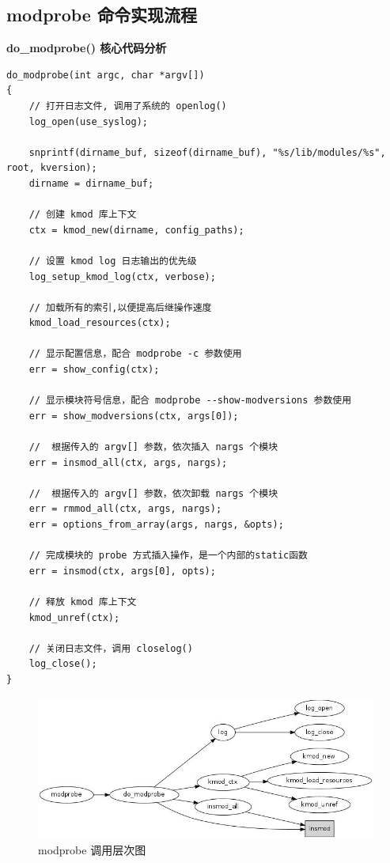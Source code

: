 \subsection{modprobe 命令实现流程}

\textbf{do\_modprobe() 核心代码分析}

{\begin{shaded}\begin{verbatim}
do_modprobe(int argc, char *argv[])
{
    // 打开日志文件, 调用了系统的 openlog()
    log_open(use_syslog);

    snprintf(dirname_buf, sizeof(dirname_buf), "%s/lib/modules/%s", root, kversion);
    dirname = dirname_buf;

    // 创建 kmod 库上下文
    ctx = kmod_new(dirname, config_paths);

    // 设置 kmod log 日志输出的优先级
    log_setup_kmod_log(ctx, verbose);

    // 加载所有的索引,以便提高后继操作速度
    kmod_load_resources(ctx);

    // 显示配置信息，配合 modprobe -c 参数使用
    err = show_config(ctx); 

    // 显示模块符号信息，配合 modprobe --show-modversions 参数使用
    err = show_modversions(ctx, args[0]);

    //  根据传入的 argv[] 参数，依次插入 nargs 个模块
    err = insmod_all(ctx, args, nargs);

    //  根据传入的 argv[] 参数，依次卸载 nargs 个模块
    err = rmmod_all(ctx, args, nargs); 
    err = options_from_array(args, nargs, &opts);

    // 完成模块的 probe 方式插入操作，是一个内部的static函数
    err = insmod(ctx, args[0], opts);

    // 释放 kmod 库上下文
    kmod_unref(ctx);

    // 关闭日志文件，调用 closelog()
    log_close();
}
\end{verbatim}\end{shaded}}
\begin{figure}[htbp]
\centering
\includegraphics{./figures/modprobe.jpg}
\caption{modprobe 调用层次图}
\end{figure}

